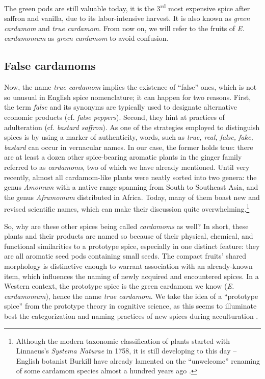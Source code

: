 \documentclass[12pt]{article}
\begin{document}
The green pods are still valuable today, it is the 3\textsuperscript{rd} most expensive spice after saffron and vanilla, due to its labor-intensive harvest. It is also known as \textit{green cardamom} and \textit{true cardamom}. From now on, we will refer to the fruits of \textit{E. cardamomum} as \textit{green cardamom} to avoid confusion.

\subsection{False cardamoms}

Now, the name \textit{true cardamom} implies the existence of ``false'' ones, which is not so unusual in English spice nomenclature; it can happen for two reasons. First, the term \textit{false} and its synonyms are typically used to designate alternative economic products (cf. \textit{false peppers}). Second, they hint at practices of adulteration (cf. \textit{bastard saffron}). As one of the strategies employed to distinguish spices is by using a marker of authenticity, words, such as \textit{true, real, false, fake, bastard} can occur in vernacular names. In our case, the former holds true: there are at least a dozen other spice-bearing aromatic plants in the ginger family referred to as \textit{cardamoms}, two of which we have already mentioned. Until very recently, almost all cardamom-like plants were neatly sorted into two genera: the genus \textit{Amomum} with a native range spanning from South to Southeast Asia, and the genus \textit{Aframomum} distributed in Africa. Today, many of them boast new and revised scientific names, which can make their discussion quite overwhelming.\footnote{Although the modern taxonomic classification of plants started with Linnaeus's \textit{Systema Naturae} in 1758, it is still developing to this day -- English botanist Burkill have already lamented on the ``unwelcome'' renaming of some cardamom species almost a hundred years ago \parencite[see][]{burkill_1930_cardamoms}.}

So, why are these other spices being called \textit{cardamoms} as well? In short, these plants and their products are named so because of their physical, chemical, and functional similarities to a prototype spice, especially in one distinct feature: they are all aromatic seed pods containing small seeds. The compact fruits' shared morphology is distinctive enough to warrant association with an already-known item, which influences the naming of newly acquired and encountered spices. In a Western context, the prototype spice is the green cardamom we know (\textit{E. cardamomum}), hence the name \textit{true cardamom}. We take the idea of a ``prototype spice'' from the prototype theory in cognitive science, as this seems to illuminate best the categorization and naming practices of new spices during acculturation \parencite[see][]{parti_2023_mapping}.
\end{document}
